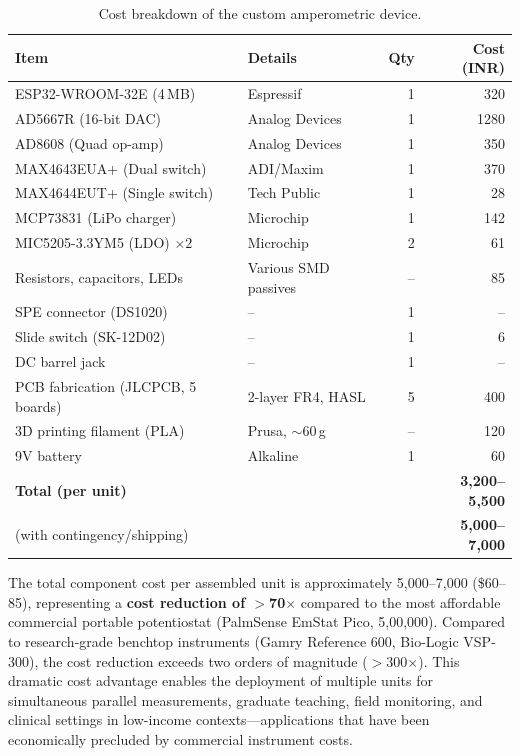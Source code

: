 \begin{table}[H]
\centering
\caption{Cost breakdown of the custom amperometric device.}
\label{tab:cost}
\begin{tabular}{@{}llrr@{}}
\toprule
\textbf{Item} & \textbf{Details} & \textbf{Qty} & \textbf{Cost (INR)} \\
\midrule
ESP32-WROOM-32E (4\,MB) & Espressif & 1 & 320 \\
AD5667R (16-bit DAC)    & Analog Devices & 1 & 1280 \\
AD8608 (Quad op-amp)    & Analog Devices & 1 & 350 \\
MAX4643EUA+ (Dual switch) & ADI/Maxim & 1 & 370 \\
MAX4644EUT+ (Single switch) & Tech Public & 1 & 28 \\
MCP73831 (LiPo charger) & Microchip & 1 & 142 \\
MIC5205-3.3YM5 (LDO) $\times 2$ & Microchip & 2 & 61 \\
Resistors, capacitors, LEDs & Various SMD passives & -- & 85 \\
SPE connector (DS1020) & -- & 1 & -- \\
Slide switch (SK-12D02) & -- & 1 & 6 \\
DC barrel jack & -- & 1 & -- \\
PCB fabrication (JLCPCB, 5 boards) & 2-layer FR4, HASL & 5 & 400 \\
3D printing filament (PLA) & Prusa, $\sim$60\,g & -- & 120 \\
9V battery & Alkaline & 1 & 60 \\
\midrule
\textbf{Total (per unit)} & & & \textbf{\texttildelow{}3,200--5,500} \\
(with contingency/shipping) & & & \textbf{\texttildelow{}5,000--7,000} \\
\bottomrule
\end{tabular}
\end{table}

\noindent The total component cost per assembled unit is approximately \rupee{}5,000--7,000 (\$60--85), representing a \textbf{cost reduction of $>$70$\times$} compared to the most affordable commercial portable potentiostat (PalmSense EmStat Pico, \texttildelow\rupee{}5,00,000). Compared to research-grade benchtop instruments (Gamry Reference 600, Bio-Logic VSP-300), the cost reduction exceeds two orders of magnitude ($>$300$\times$). This dramatic cost advantage enables the deployment of multiple units for simultaneous parallel measurements, graduate teaching, field monitoring, and clinical settings in low-income contexts—applications that have been economically precluded by commercial instrument costs.
